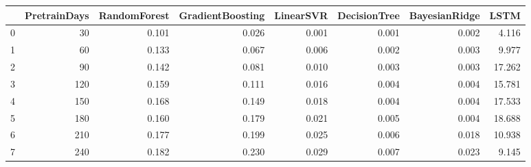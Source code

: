 \begin{tabular}{lrrrrrrr}
\toprule
{} &  PretrainDays &  RandomForest &  GradientBoosting &  LinearSVR &  DecisionTree &  BayesianRidge &   LSTM \\
\midrule
0 &            30 &         0.101 &             0.026 &      0.001 &         0.001 &          0.002 &  4.116 \\
1 &            60 &         0.133 &             0.067 &      0.006 &         0.002 &          0.003 &  9.977 \\
2 &            90 &         0.142 &             0.081 &      0.010 &         0.003 &          0.003 & 17.262 \\
3 &           120 &         0.159 &             0.111 &      0.016 &         0.004 &          0.004 & 15.781 \\
4 &           150 &         0.168 &             0.149 &      0.018 &         0.004 &          0.004 & 17.533 \\
5 &           180 &         0.160 &             0.179 &      0.021 &         0.005 &          0.004 & 18.688 \\
6 &           210 &         0.177 &             0.199 &      0.025 &         0.006 &          0.018 & 10.938 \\
7 &           240 &         0.182 &             0.230 &      0.029 &         0.007 &          0.023 &  9.145 \\
\bottomrule
\end{tabular}
